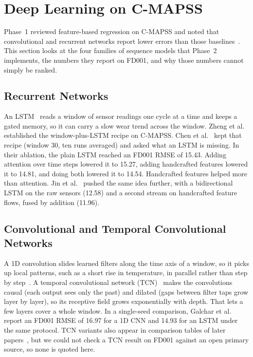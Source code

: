 
\section{Deep Learning on C-MAPSS}
\label{sec:lit_dl}

Phase~1 reviewed feature-based regression on C-MAPSS and noted that
convolutional and recurrent networks report lower errors than those
baselines~\cite{SateeshBabu2016deep,Li2018remaining,Zheng2017long}. This
section looks at the four families of sequence models that Phase~2 implements,
the numbers they report on FD001, and why those numbers cannot simply be
ranked.

\subsection{Recurrent Networks}
An LSTM~\cite{Hochreiter1997long} reads a window of sensor readings one cycle
at a time and keeps a gated memory, so it can carry a slow wear trend across
the window. Zheng et al.~\cite{Zheng2017long} established the
window-plus-LSTM recipe on C-MAPSS. Chen et al.~\cite{Chen2021machine} kept
that recipe (window 30, ten runs averaged) and asked what an LSTM is missing.
In their ablation, the plain LSTM reached an FD001 RMSE of 15.43. Adding
attention over time steps lowered it to 15.27, adding handcrafted features
lowered it to 14.81, and doing both lowered it to 14.54. Handcrafted features
helped more than attention. Jin et al.~\cite{Jin2022bilstm} pushed the same
idea further, with a bidirectional LSTM on the raw sensors (12.58) and a second
stream on handcrafted feature flows, fused by addition (11.96).

\subsection{Convolutional and Temporal Convolutional Networks}
A 1D convolution slides learned filters along the time axis of a window, so it
picks up local patterns, such as a short rise in temperature, in parallel
rather than step by step~\cite{SateeshBabu2016deep,Li2018remaining}. A
temporal convolutional network (TCN)~\cite{Bai2018empirical} makes the
convolutions causal (each output sees only the past) and dilated (gaps between
filter taps grow layer by layer), so its receptive field grows exponentially
with depth. That lets a few layers cover a whole window. In a single-seed
comparison, Galchar et al.~\cite{Galchar2026remaining} report an FD001 RMSE of
16.97 for a 1D CNN and 14.93 for an LSTM under the same protocol. TCN variants
also appear in comparison tables of later papers~\cite{Zhang2022dual}, but we
could not check a TCN result on FD001 against an open primary source, so none
is quoted here.

